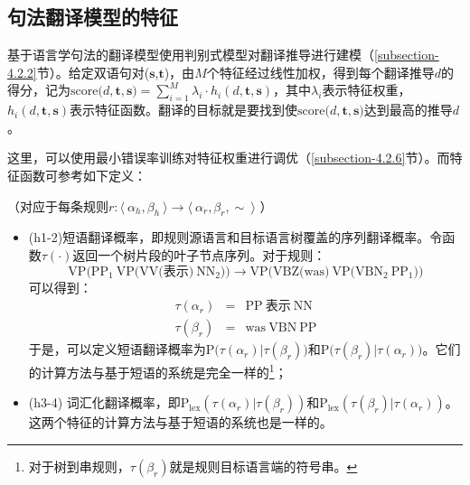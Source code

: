 
\subsection{句法翻译模型的特征}

\parinterval 基于语言学句法的翻译模型使用判别式模型对翻译推导进行建模（\ref{subsection-4.2.2}节）。给定双语句对($\mathbf{s}$,$\mathbf{t}$)，由$M$个特征经过线性加权，得到每个翻译推导$d$的得分，记为$\textrm{score(}d,\mathbf{t},\mathbf{s})=\sum_{i=1}^{M} \lambda_i \cdot h_{i}(d,\mathbf{t},\mathbf{s})$，其中$\lambda_i$表示特征权重，$h_{i}(d,\mathbf{t},\mathbf{s})$表示特征函数。翻译的目标就是要找到使$\textrm{score(}d,\mathbf{t},\mathbf{s})$达到最高的推导$d$。

\parinterval 这里，可以使用最小错误率训练对特征权重进行调优（\ref{subsection-4.2.6}节）。而特征函数可参考如下定义：

\vspace{0.5em}
（对应于每条规则$r : \langle\  \alpha_h, \beta_h\ \rangle \to \langle\ \alpha_r, \beta_r, \sim\ \rangle$ ）

\begin{itemize}
\vspace{0.5em}
\item (h1-2)短语翻译概率，即规则源语言和目标语言树覆盖的序列翻译概率。令函数$\tau(\cdot)$返回一个树片段的叶子节点序列。对于规则：
\begin{displaymath}
\textrm{VP(}\textrm{PP}_1\ \textrm{VP(VV(表示)}\ \textrm{NN}_2\textrm{))} \rightarrow \textrm{VP(VBZ(was)}\ \textrm{VP(}\textrm{VBN}_2\ \textrm{PP}_1\textrm{))}
\end{displaymath}
\noindent 可以得到：
\begin{eqnarray}
\tau( \alpha_r ) & = & \textrm{PP}\ \textrm{表示}\ \textrm{NN} \nonumber \\
\tau( \beta_r ) & = & \textrm{was}\ \textrm{VBN}\ \textrm{PP} \nonumber
\end{eqnarray}
\noindent 于是，可以定义短语翻译概率为$\textrm{P(}\tau( \alpha_r )|\tau( \beta_r ))$和$\textrm{P(}\tau( \beta_r )|\tau( \alpha_r ))$。它们的计算方法与基于短语的系统是完全一样的\footnote[9]{对于树到串规则，$\tau( \beta_r )$就是规则目标语言端的符号串。}；
\vspace{0.5em}
\item (h3-4) 词汇化翻译概率，即$\textrm{P}_{\textrm{lex}}(\tau( \alpha_r )|\tau( \beta_r ))$和$\textrm{P}_{\textrm{lex}}(\tau( \beta_r )|\tau( \alpha_r ))$。这两个特征的计算方法与基于短语的系统也是一样的。
\vspace{0.5em}
\end{itemize}

